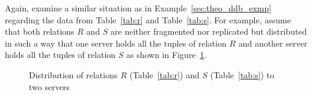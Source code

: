 \begin{exmp} \label{sec:theo_dqp_exmp}
Again, examine a similar situation as in Example~\ref{sec:theo_ddb_exmp} regarding the data from Table~\ref{tab:r} and Table~\ref{tab:s}. For example, 
assume that both relations $R$ and $S$ are neither fragmented nor replicated but distributed in such a way that one server holds all the tuples of 
relation $R$ and another server holds all the tuples of relation $S$ as shown in Figure~\ref{fig:dqp_rs_simple}.


\begin{figure}[h]
    \centering
\caption{Distribution of relations $R$ (Table~\ref{tab:r}) and $S$ (Table~\ref{tab:s}) to two servers}
\label{fig:dqp_rs_simple}
\end{figure}



\end{exmp}
